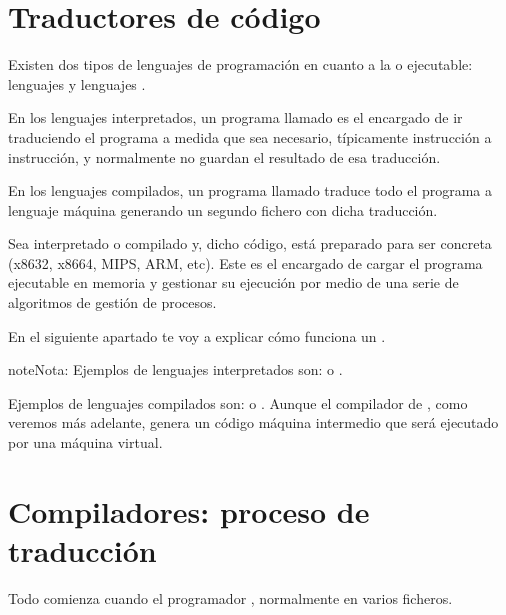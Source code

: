 \documentclass[letterpaper,10pt,spanish]{sphinxmanual}
\begin{document}
\section{Traductores de código}
\label{\detokenize{obtencion_del_codigo:traductores-de-codigo}}
\sphinxAtStartPar
Existen dos tipos de lenguajes de programación en cuanto a la  o ejecutable: lenguajes  y lenguajes .

\sphinxAtStartPar
En los lenguajes interpretados, un programa llamado  es el encargado de ir traduciendo el programa a medida que sea necesario, típicamente instrucción a instrucción, y normalmente no guardan el resultado de esa traducción.

\sphinxAtStartPar
En los lenguajes compilados, un programa llamado  traduce todo el programa a lenguaje máquina generando un segundo fichero con dicha traducción.

\sphinxAtStartPar
Sea interpretado o compilado  y, dicho código, está preparado para ser  concreta (x86\sphinxhyphen{}32, x86\sphinxhyphen{}64, MIPS, ARM, etc). Este es el encargado de cargar el programa ejecutable en memoria y gestionar su ejecución por medio de una serie de algoritmos de gestión de procesos.

\sphinxAtStartPar
En el siguiente apartado te voy a explicar cómo funciona un .

\begin{sphinxadmonition}{note}{Nota:}
\sphinxAtStartPar
Ejemplos de lenguajes interpretados son:  o .

\sphinxAtStartPar
Ejemplos de lenguajes compilados son:  o . Aunque el compilador  de , como veremos más adelante, genera un código máquina intermedio que será ejecutado por una máquina virtual.
\end{sphinxadmonition}


\section{Compiladores: proceso de traducción}
\label{\detokenize{obtencion_del_codigo:compiladores-proceso-de-traduccion}}
\sphinxAtStartPar
Todo comienza cuando el programador , normalmente en varios ficheros.
\end{document}
